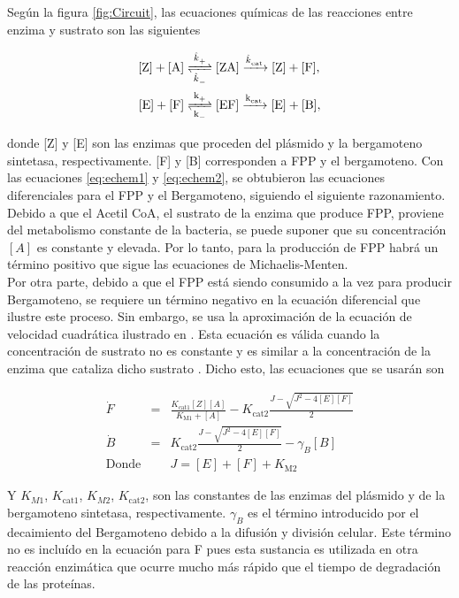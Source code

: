 \documentclass[12pt]{article}
\begin{document}
Seg\'un la figura \ref{fig:Circuit}, las ecuaciones qu\'imicas de las reacciones entre enzima y sustrato son las siguientes

\begin{align}
\ce{[Z] + [A]} &\ce{<=>[\ce{\hat{k}_+}][\ce{\hat{k}_-}] [ZA] ->[\ce{\hat{k}_{cat}}] [Z] + [F]}, \label{eq:echem1}\\
\ce{[E] + [F]} &\ce{<=>[\ce{k_+}][\ce{k_-}] [EF] ->[\ce{k_{cat}}] [E] + [B]}, \label{eq:echem2}
\end{align}

donde [Z] y [E] son las enzimas que proceden del pl\'asmido y la bergamoteno sintetasa, respectivamente. [F] y [B] corresponden a FPP y el bergamoteno. Con las ecuaciones \ref{eq:echem1} y \ref{eq:echem2}, se obtubieron las ecuaciones diferenciales para el FPP y el Bergamoteno, siguiendo el siguiente razonamiento.\\

Debido a que el Acetil CoA, el sustrato de la enzima que produce FPP, proviene del metabolismo constante de la bacteria, se puede suponer que su concentraci\'on $[A]$ es constante y elevada. Por lo tanto, para la producci\'on de FPP habr\'a un t\'ermino positivo que sigue las ecuaciones de Michaelis-Menten.\\

Por otra parte, debido a que el FPP est\'a siendo consumido a la vez para producir Bergamoteno, se requiere un t\'ermino negativo en la ecuaci\'on diferencial que ilustre este proceso. Sin embargo, se usa la aproximaci\'on de la ecuaci\'on de velocidad cuadr\'atica ilustrado en \cite{chemwiki1}. Esta ecuaci\'on es v\'alida cuando la concentraci\'on de sustrato no es constante y es similar a la concentraci\'on de la enzima que cataliza dicho sustrato \cite{chemwiki1}. Dicho esto, las ecuaciones que se usar\'an son

\begin{eqnarray}
\dot{F} &=& \frac{K_{\text{cat1}}[Z][A]}{K_{\text{M1}}+[A]} - K_{\text{cat2}}\frac{J-\sqrt{J^2-4[E][F]}}{2} \label{eq:DiffF}\\
\dot{B} &=& K_{\text{cat2}}\frac{J-\sqrt{J^2-4[E][F]}}{2} - \gamma_B [B] \label{eq:DiffB}\\
\text{Donde} && J=[E]+[F]+K_{\text{M2}} \nonumber
\end{eqnarray}

Y $K_{M1}$, $K_{\text{cat}1}$, $K_{M2}$, $K_{\text{cat}2}$, son las constantes de las enzimas del pl\'asmido y de la bergamoteno sintetasa, respectivamente. $\gamma_B$ es el t\'ermino introducido por el decaimiento del Bergamoteno debido a la difusi\'on y divisi\'on celular. Este t\'ermino no es inclu\'ido en la ecuaci\'on para F pues esta sustancia es utilizada en otra reacci\'on enzim\'atica que ocurre mucho m\'as r\'apido que el tiempo de degradaci\'on de las prote\'inas.\\
\end{document}

